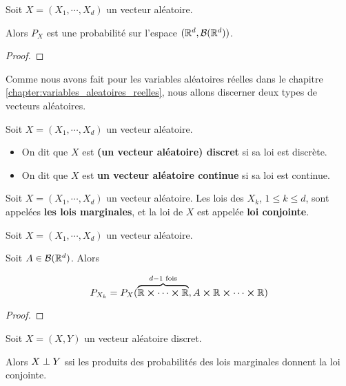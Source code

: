 \begin{proposition}
	Soit $X = (X_{1}, \cdots, X_{d})$ un vecteur aléatoire.

	Alors $P_{X}$ est une probabilité sur l'espace $(\mathbb{R}^{d},
	\mathcal{B}(\mathbb{R}^{d}))$.
\end{proposition}

\ifdefined\outputproof
\begin{proof}

\end{proof}

Comme nous avons fait pour les variables aléatoires réelles dans le chapitre
\ref{chapter:variables_aleatoires_reelles}, nous allons discerner deux
types de vecteurs aléatoires.

\begin{definition}
	Soit $X = (X_{1}, \cdots, X_{d})$ un vecteur aléatoire.

	\begin{itemize}
		\item On dit que $X$ est \textbf{(un vecteur aléatoire) discret} si sa
			loi est discrète.
		\item On dit que $X$ est \textbf{un vecteur aléatoire continue} si sa
			loi est continue.
	\end{itemize}
\end{definition}

\begin{definition}
	Soit $X = (X_{1}, \cdots, X_{d})$ un vecteur aléatoire.
	Les lois des $X_{k}$, $1 \leq k \leq d$, sont appelées \textbf{les lois
	marginales}, et la loi de $X$ est appelée \textbf{loi conjointe}.
\end{definition}

\begin{proposition}
	Soit $X = (X_{1}, \cdots, X_{d})$ un vecteur aléatoire.

	Soit $A \in \mathcal{B}(\mathbb{R}^{d})$.
	Alors

	\begin{equation}
		P_{X_{k}} = P_{X}(\overbrace{\mathbb{R} \cross \cdots \cross \mathbb{R}}^{d - 1 \text{ fois}},
	A \cross \mathbb{R} \cross \cdots \cross \mathbb{R})
	\end{equation}
\end{proposition}

\ifdefined\outputproof
\begin{proof}

\end{proof}

\begin{corollary}
	Soit $X = (X, Y)$ un vecteur aléatoire discret.

	Alors $X \perp Y$ ssi les produits des probabilités des lois
	marginales donnent la loi conjointe.
\end{corollary}

